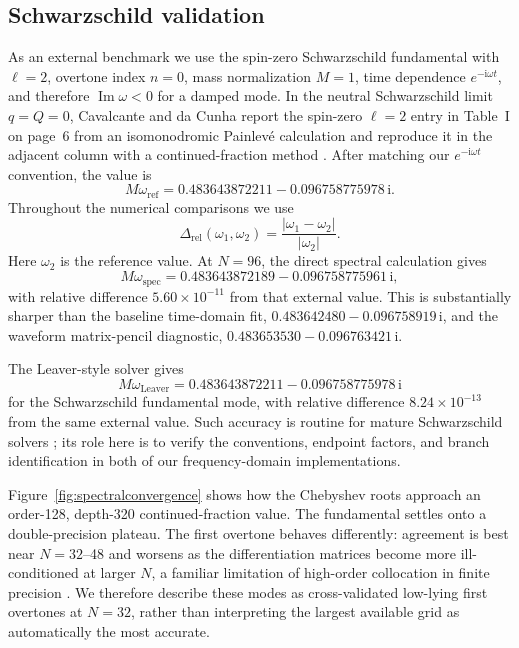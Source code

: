 \documentclass[12pt,a4paper]{article}
\newcommand{\ii}{\mathrm{i}}
\begin{document}
\subsection{Schwarzschild validation}

\color{blue}
As an external benchmark we use the spin-zero Schwarzschild fundamental with
\(\ell=2\), overtone index \(n=0\), mass normalization \(M=1\), time dependence
\(e^{-\ii\omega t}\), and therefore \(\operatorname{Im}\omega<0\) for a damped
mode.  In the neutral Schwarzschild limit \(q=Q=0\), Cavalcante and da Cunha
report the spin-zero \(\ell=2\) entry in Table~I on page~6 from an
isomonodromic Painlev\'e calculation and reproduce it in the adjacent column
with a continued-fraction method \cite{Cavalcante2021}.  After matching our
\(e^{-\ii\omega t}\) convention, the value is
\begin{equation*}
M\omega_{\mathrm{ref}}=0.483643872211-0.096758775978\,\ii.
\end{equation*}
Throughout the numerical comparisons we use
\begin{equation*}
\Delta_{\mathrm{rel}}(\omega_1,\omega_2)
=\frac{|\omega_1-\omega_2|}{|\omega_2|}.
\end{equation*}
Here \(\omega_2\) is the reference value.
\color{black}
At \(N=96\), the direct spectral calculation gives
\begin{equation*}
M\omega_{\mathrm{spec}}=0.483643872189-0.096758775961\,\ii,
\end{equation*}
\color{blue}
with relative difference \(5.60\times10^{-11}\) from that external value. This is substantially sharper than the baseline time-domain fit, \(0.483642480-0.096758919\,\ii\), and the waveform matrix-pencil diagnostic, \(0.483653530-0.096763421\,\ii\).
\color{black}

The Leaver-style solver gives
\begin{equation*}
M\omega_{\mathrm{Leaver}}=0.483643872211-0.096758775978\,\ii
\end{equation*}
\color{blue}
for the Schwarzschild fundamental mode, with relative difference
\(8.24\times10^{-13}\) from the same external value. Such accuracy is routine
for mature Schwarzschild solvers \cite{Leaver1985,Cavalcante2021}; its role here
is to verify the conventions, endpoint factors, and branch identification in
both of our frequency-domain implementations.
\color{black}

\color{blue}
Figure~\ref{fig:spectralconvergence} shows how the Chebyshev roots approach an
order-128, depth-320 continued-fraction value. The fundamental settles onto a
double-precision plateau. The first overtone behaves differently: agreement is
best near \(N=32\)--48 and worsens as the differentiation matrices become more
ill-conditioned at larger \(N\), a familiar limitation of high-order
collocation in finite precision \cite{Jansen2017}. We therefore describe these
modes as cross-validated low-lying first overtones at \(N=32\), rather than
interpreting the largest available grid as automatically the most accurate.
\color{black}
\end{document}

